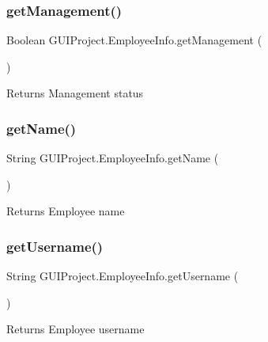 \subsubsection{\texorpdfstring{getManagement()}{getManagement()}}
{\footnotesize\ttfamily Boolean G\+U\+I\+Project.\+Employee\+Info.\+get\+Management (\begin{DoxyParamCaption}{ }\end{DoxyParamCaption})}

\begin{DoxyReturn}{Returns}
Management status 
\end{DoxyReturn}
\mbox{\label{class_g_u_i_project_1_1_employee_info_a86c735f9f69bf5dd090006da7d39200f}} 
\subsubsection{\texorpdfstring{getName()}{getName()}}
{\footnotesize\ttfamily String G\+U\+I\+Project.\+Employee\+Info.\+get\+Name (\begin{DoxyParamCaption}{ }\end{DoxyParamCaption})}

\begin{DoxyReturn}{Returns}
Employee name 
\end{DoxyReturn}
\mbox{\label{class_g_u_i_project_1_1_employee_info_a2af47ab007131039a5fd8754c6126285}} 
\subsubsection{\texorpdfstring{getUsername()}{getUsername()}}
{\footnotesize\ttfamily String G\+U\+I\+Project.\+Employee\+Info.\+get\+Username (\begin{DoxyParamCaption}{ }\end{DoxyParamCaption})}

\begin{DoxyReturn}{Returns}
Employee username 
\end{DoxyReturn}
\mbox{\label{class_g_u_i_project_1_1_employee_info_a9a85ee58dcc3ff7f4f4c36a744d4a053}} 
